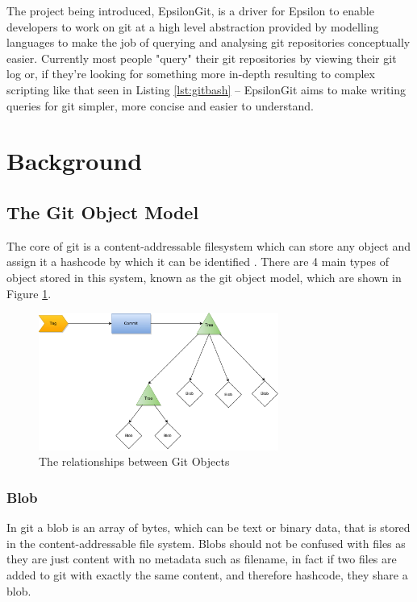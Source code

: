 \documentclass[runningheads,a4paper]{llncs}
\begin{document}
The project being introduced, EpsilonGit, is a driver for Epsilon to enable developers to work on git at a high level abstraction provided by modelling languages to make the job of querying and analysing git repositories conceptually easier. Currently most people "query" their git repositories by viewing their git log or, if they're looking for something more in-depth resulting to complex scripting like that seen in Listing \ref{lst:gitbash} -- EpsilonGit aims to make writing queries for git simpler, more concise and easier to understand.

\section{Background}
\subsection{The Git Object Model}
The core of git is a content-addressable filesystem which can store any object and assign it a hashcode by which it can be identified \cite{progit}. There are 4 main types of object stored in this system, known as the git object model, which are shown in Figure \ref{fig:gitobjectmodeldiagram}.

\begin{figure}[h]
	\centering
	\includegraphics[width=0.7\textwidth]{../thesis/images/gitobjectmodel}
	\caption{The relationships between Git Objects}
	\label{fig:gitobjectmodeldiagram}
\end{figure} 

\subsubsection{Blob}
In git a blob is an array of bytes, which can be text or binary data, that is stored in the content-addressable file system. Blobs should not be confused with files as they are just content with no metadata such as filename, in fact if two files are added to git with exactly the same content, and therefore hashcode, they share a blob.
\end{document}
